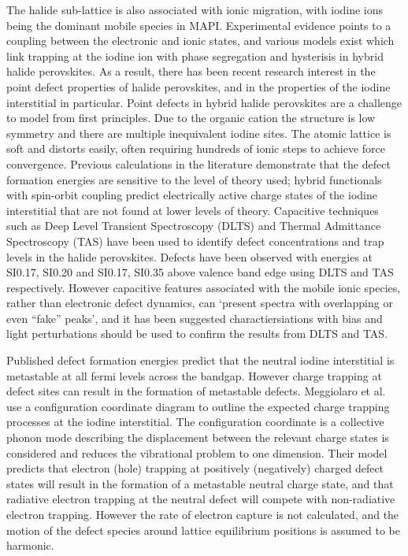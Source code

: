 The halide sub-lattice is also associated with ionic migration, with iodine ions being the dominant mobile species in MAPI.%
Experimental evidence points to a coupling between the electronic and ionic states, and various models exist which link trapping at the iodine ion with phase segregation and hysterisis in hybrid halide perovskites.
As a result, there has been recent research interest in the point defect properties of halide perovskites, and in the properties of the iodine interstitial in particular.
Point defects in hybrid halide perovskites are a challenge to model from first principles. Due to the organic cation the structure is low symmetry and there are multiple inequivalent iodine sites. The atomic lattice is soft and distorts easily, often requiring hundreds of ionic steps to achieve force convergence. 
Previous calculations in the literature demonstrate that the defect formation energies are sensitive to the level of theory used; hybrid functionals with spin-orbit coupling predict electrically active charge states of the iodine interstitial that are not found at lower levels of theory.
Capacitive techniques such as Deep Level Transient Spectroscopy (DLTS) and Thermal Admittance Spectroscopy (TAS) have been used to identify defect concentrations and trap levels in the halide perovskites.
Defects have been observed with energies at SI{0.17}{\electronvolt}, SI{0.20}{\electronvolt} and SI{0.17}{\electronvolt}, SI{0.35}{\electronvolt} above valence band edge using DLTS and TAS respectively.
However capacitive features associated with the mobile ionic species, rather than electronic defect dynamics, can `present spectra with overlapping or even ``fake'' peaks', and it has been suggested charactiersiations with bias and light perturbations should be used to confirm the results from DLTS and TAS.


Published defect formation energies predict that the neutral iodine interstitial is metastable at all fermi levels across the bandgap.
However charge trapping at defect sites can result in the formation of metastable defects.
Meggiolaro et al. use a configuration coordinate diagram to outline the expected charge trapping processes at the iodine interstitial. 
The configuration coordinate is a collective phonon mode describing the displacement between the relevant charge states is considered and reduces the vibrational problem to one dimension.
Their model predicts that electron (hole) trapping at positively (negatively) charged defect states will result in the formation of a metastable neutral charge state, and that radiative electron trapping at the neutral defect will compete with non-radiative electron trapping.
However the rate of electron capture is not calculated, and the motion of the defect species around lattice equilibrium positions is assumed to be harmonic.


